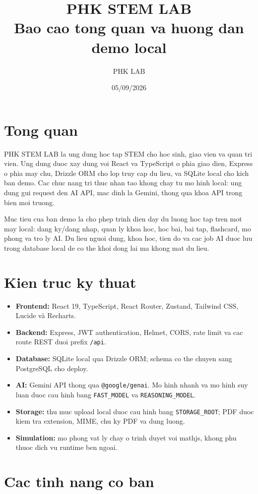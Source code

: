 \documentclass[12pt,a4paper]{article}
\title{PHK STEM LAB\\\large Bao cao tong quan va huong dan demo local}
\author{PHK LAB}
\date{05/09/2026}
\begin{document}
\maketitle
\tableofcontents
\newpage

\section{Tong quan}
PHK STEM LAB la ung dung hoc tap STEM cho hoc sinh, giao vien va quan tri vien. Ung dung duoc xay dung voi React va TypeScript o phia giao dien, Express o phia may chu, Drizzle ORM cho lop truy cap du lieu, va SQLite local cho kich ban demo. Cac chuc nang tri thuc nhan tao khong chay tu mo hinh local: ung dung gui request den AI API, mac dinh la Gemini, thong qua khoa API trong bien moi truong.

Muc tieu cua ban demo la cho phep trinh dien day du luong hoc tap tren mot may local: dang ky/dang nhap, quan ly khoa hoc, hoc bai, bai tap, flashcard, mo phong va tro ly AI. Du lieu nguoi dung, khoa hoc, tien do va cac job AI duoc luu trong database local de co the khoi dong lai ma khong mat du lieu.

\section{Kien truc ky thuat}
\begin{itemize}[leftmargin=*]
  \item \textbf{Frontend:} React 19, TypeScript, React Router, Zustand, Tailwind CSS, Lucide và Recharts.
  \item \textbf{Backend:} Express, JWT authentication, Helmet, CORS, rate limit va cac route REST duoi prefix \texttt{/api}.
  \item \textbf{Database:} SQLite local qua Drizzle ORM; schema co the chuyen sang PostgreSQL cho deploy.
  \item \textbf{AI:} Gemini API thong qua \texttt{@google/genai}. Mo hinh nhanh va mo hinh suy luan duoc cau hinh bang \texttt{FAST\_MODEL} va \texttt{REASONING\_MODEL}.
  \item \textbf{Storage:} thu muc upload local duoc cau hinh bang \texttt{STORAGE\_ROOT}; PDF duoc kiem tra extension, MIME, chu ky PDF va dung luong.
  \item \textbf{Simulation:} mo phong vat ly chay o trinh duyet voi mathjs, khong phu thuoc dich vu runtime ben ngoai.
\end{itemize}

\section{Cac tinh nang co ban}
\end{document}

